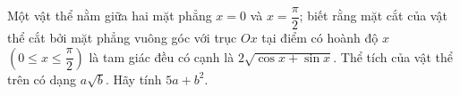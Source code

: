 \begin{ex}%
Một vật thể nằm giữa hai mặt phẳng $x = 0$ và $x = \dfrac{\pi}{2}$; biết rằng mặt cắt của vật thể cắt bởi mặt phẳng vuông góc với trục $Ox$ tại điểm có hoành độ $x$ $\left(0 \leq x \leq \dfrac{\pi}{2}\right)$ là tam giác đều có cạnh là $2\sqrt{\cos x + \sin x}$. Thể tích của vật thể trên có dạng $a\sqrt{b}$. Hãy tính $5a + b^2$.
\end{ex}

